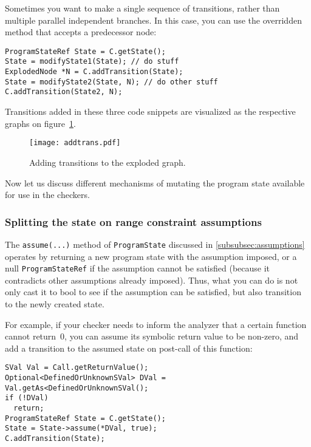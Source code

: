 \documentclass[a4paper,12pt]{article}
\def\imgscale{0.20}
\newenvironment{nobr}{\begin{minipage}{\textwidth}\setlength\parskip{1em}
}{\end{minipage}\ignorespacesafterend}
\begin{document}
Sometimes you want to make a single sequence of transitions, rather than multiple parallel independent branches. In this case, you can use the overridden method that accepts a predecessor node:

\begin{lstlisting}[style=cplusplus,numbers=none]
ProgramStateRef State = C.getState();
State = modifyState1(State); // do stuff
ExplodedNode *N = C.addTransition(State);
State = modifyState2(State, N); // do other stuff
C.addTransition(State2, N);
\end{lstlisting}

Transitions added in these three code snippets are visualized as the respective graphs on figure~\ref{fig:addtrans}.

\begin{figure}[!ht]\center
\texttt{[image: addtrans.pdf]}
\caption{Adding transitions to the exploded graph.}
\label{fig:addtrans}
\end{figure}

Now let us discuss different mechanisms of mutating the program state available for use in the checkers.

\subsubsection{Splitting the state on range constraint assumptions}

The \lstinline|assume(...)| method of \lstinline|ProgramState| discussed in \ref{subsubsec:assumptions} operates by returning a new program state with the assumption imposed, or a null \lstinline|ProgramStateRef| if the assumption cannot be satisfied (because it contradicts other assumptions already imposed). Thus, what you can do is not only cast it to bool to see if the assumption can be satisfied, but also transition to the newly created state.

\begin{nobr}
For example, if your checker needs to inform the analyzer that a certain function cannot return~$0$, you can assume its symbolic return value to be non-zero, and add a transition to the assumed state on post-call of this function:

\begin{lstlisting}[style=cplusplus,numbers=none]
SVal Val = Call.getReturnValue();
Optional<DefinedOrUnknownSVal> DVal = Val.getAs<DefinedOrUnknownSVal();
if (!DVal)
  return;
ProgramStateRef State = C.getState();
State = State->assume(*DVal, true);
C.addTransition(State);
\end{lstlisting}
\end{nobr}
\end{document}
